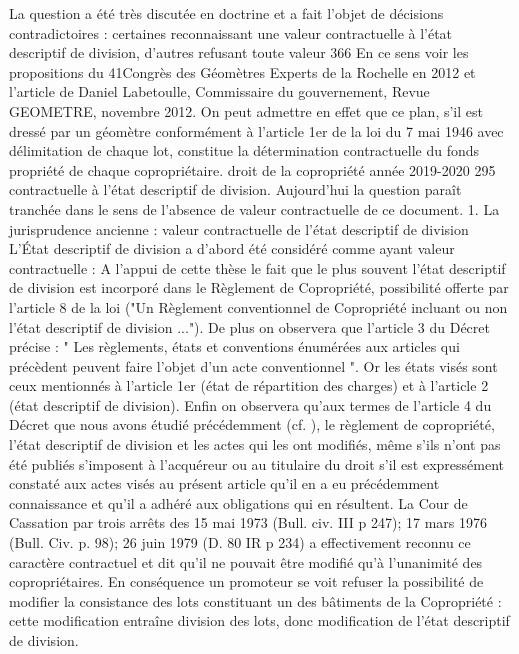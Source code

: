 		La question a été très discutée en doctrine et a fait l'objet de décisions contradictoires : certaines reconnaissant une valeur contractuelle à l’état descriptif de division, d'autres refusant toute valeur
		366 En ce sens voir les propositions du 41\degres Congrès des Géomètres Experts de la Rochelle en 2012 et l’article de Daniel Labetoulle, Commissaire du gouvernement, Revue GEOMETRE, novembre 2012. On peut admettre en effet que ce plan, s’il est dressé par un géomètre conformément à l’article 1er de la loi du 7 mai 1946 avec délimitation de chaque lot, constitue la détermination contractuelle du fonds propriété de chaque copropriétaire.
		droit de la copropriété année 2019-2020
		295
		contractuelle à l’état descriptif de division. Aujourd'hui la question paraît tranchée dans le sens de l'absence de valeur contractuelle de ce document.
		1. La jurisprudence ancienne : valeur contractuelle de l’état descriptif de division
		L'État descriptif de division a d’abord été considéré comme ayant valeur contractuelle :
		A l'appui de cette thèse le fait que le plus souvent l’état descriptif de division est incorporé dans le Règlement de Copropriété, possibilité offerte par l'article 8 de la loi ("Un Règlement conventionnel de Copropriété incluant ou non l’état descriptif de division ...").
		De plus on observera que l'article 3 du Décret précise : " Les règlements, états et conventions énumérées aux articles qui précèdent peuvent faire l'objet d'un acte conventionnel ". Or les états visés sont ceux mentionnés à l'article 1er (état de répartition des charges) et à l'article 2 (état descriptif de division).
		Enfin on observera qu'aux termes de l'article 4 du Décret que nous avons étudié précédemment (cf. ), le règlement de copropriété, l'état descriptif de division et les actes qui les ont modifiés, même s'ils n'ont pas été publiés s'imposent à l'acquéreur ou au titulaire du droit s'il est expressément constaté aux actes visés au présent article qu'il en a eu précédemment connaissance et qu'il a adhéré aux obligations qui en résultent.
		La Cour de Cassation par trois arrêts des 15 mai 1973 (Bull. civ. III  p 247); 17 mars 1976 (Bull. Civ.  p. 98); 26 juin 1979 (D. 80 IR p 234) a effectivement reconnu ce caractère contractuel et dit qu’il ne pouvait être modifié qu'à l'unanimité des copropriétaires.
		En conséquence un promoteur se voit refuser la possibilité de modifier la consistance des lots constituant un des bâtiments de la Copropriété : cette modification entraîne division des lots, donc modification de l'état descriptif de division.
